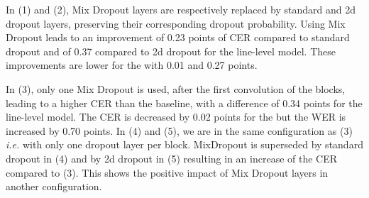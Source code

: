 \label{section-exp-dropout}
\begin{table}[!h]
    \caption{Dropout strategy analysis. Results are given for the IAM test set.}
    \centering
    \label{table:dropout}
\end{table}

In (1) and (2), Mix Dropout layers are respectively replaced by standard and 2d dropout layers, preserving their corresponding dropout probability. Using Mix Dropout leads to an improvement of 0.23 points of CER compared to standard dropout and of 0.37 compared to 2d dropout for the line-level model. These improvements are lower for the \modelacc{} with 0.01 and 0.27 points.

In (3), only one Mix Dropout is used, after the first convolution of the blocks, leading to a higher CER than the baseline, with a difference of 0.34 points for the line-level model. The CER is decreased by 0.02 points for the \modelacc{} but the WER is increased by 0.70 points.
In (4) and (5), we are in the same configuration as (3) \textit{i.e.} with only one dropout layer per block. MixDropout is superseded by standard dropout in (4) and by 2d dropout in (5) resulting in an increase of the CER compared to (3). This shows the positive impact of Mix Dropout layers in another configuration.

